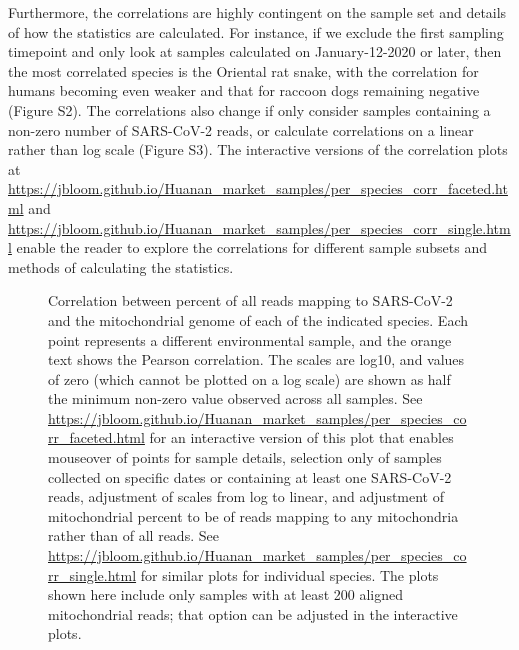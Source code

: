 \documentclass[9pt,twocolumn,twoside]{gsajnl_modified}
\begin{document}
Furthermore, the correlations are highly contingent on the sample set and details of how the statistics are calculated.
For instance, if we exclude the first sampling timepoint and only look at samples calculated on January-12-2020 or later, then the most correlated species is the Oriental rat snake, with the correlation for humans becoming even weaker and that for raccoon dogs remaining negative (Figure S2).
The correlations also change if only consider samples containing a non-zero number of SARS-CoV-2 reads, or calculate correlations on a linear rather than log scale (Figure S3).
The interactive versions of the correlation plots at \url{https://jbloom.github.io/Huanan_market_samples/per_species_corr_faceted.html} and \url{https://jbloom.github.io/Huanan_market_samples/per_species_corr_single.html} enable the reader to explore the correlations for different sample subsets and methods of calculating the statistics.

\begin{figure*}
\caption{
Correlation between percent of all reads mapping to SARS-CoV-2 and the mitochondrial genome of each of the indicated species.
Each point represents a different environmental sample, and the orange text shows the Pearson correlation.
The scales are log10, and values of zero (which cannot be plotted on a log scale) are shown as half the minimum non-zero value observed across all samples.
See \url{https://jbloom.github.io/Huanan_market_samples/per_species_corr_faceted.html} for an interactive version of this plot that enables mouseover of points for sample details, selection only of samples collected on specific dates or containing at least one SARS-CoV-2 reads, adjustment of scales from log to linear, and adjustment of mitochondrial percent to be of reads mapping to any mitochondria rather than of all reads.
See \url{https://jbloom.github.io/Huanan_market_samples/per_species_corr_single.html} for similar plots for individual species.
The plots shown here include only samples with at least 200 aligned mitochondrial reads; that option can be adjusted in the interactive plots.
\label{fig:per_species_corr_faceted}
}
\end{figure*}
\end{document}
